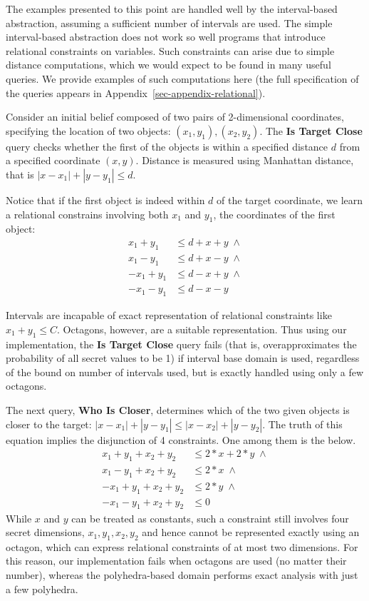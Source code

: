 The examples presented to this point are handled well by the
interval-based abstraction, assuming a sufficient number of intervals
are used.  The simple interval-based abstraction does not work so well
programs that introduce relational constraints on variables.  Such
constraints can arise due to simple distance 
computations, which we would expect to be found in many useful
queries. We provide examples of such computations here (the full
specification of the queries appears in
Appendix~\ref{sec-appendix-relational}). 

Consider an initial belief composed of two pairs of 2-dimensional
coordinates, specifying the location of two objects: $ (x_1,y_1),
(x_2,y_2)$. The \textbf{Is Target Close} query checks
whether the first of the objects is within a specified distance $ d $
from a specified coordinate $ (x,y) $. Distance is measured using
Manhattan distance, that is $ | x - x_1 | + | y - y_1 | \leq d $. 

Notice that if the first object is indeed within $ d $ of the target
coordinate, we learn a relational constrains involving both $ x_1 $
and $ y_1 $, the coordinates of the first object:
\begin{align*}
x_1 + y_1 & \leq d + x + y\; \wedge \\
x_1 - y_1 & \leq d + x - y\; \wedge \\
-x_1 + y_1 & \leq d - x + y\; \wedge \\
-x_1 - y_1 & \leq d - x - y
\end{align*}

Intervals are incapable of exact representation of relational
constraints like $ x_1 + y_1 \leq C $. Octagons, however, are a
suitable representation. Thus
using our implementation, the \textbf{Is Target Close}
query fails (that is, overapproximates the probability of all secret
values to be 1) if interval base domain is used, regardless of
the bound on number of intervals used, but is exactly handled using
only a few octagons.

The next query, \textbf{Who Is Closer}, determines which of the two given
objects is closer to the target: $ | x - x_1 | + | y - y_1 | \leq | x
- x_2 | + | y - y_2 | $. The truth of this equation implies the
disjunction of 4 constraints. One among them is the below.
\begin{align*}
x_1 + y_1 + x_2 + y_2 & \leq 2*x + 2*y\; \wedge \\
x_1 - y_1 + x_2 + y_2 & \leq 2*x\; \wedge \\
-x_1 + y_1 + x_2 + y_2 & \leq 2*y\; \wedge \\
-x_1 - y_1 + x_2 + y_2 & \leq 0
\end{align*}
While $ x $ and $ y $ can be treated as constants, such a constraint
still involves four secret dimensions, $ x_1, y_1, x_2, y_2 $ and
hence cannot be represented exactly using an octagon, which can express
relational constraints of at most two dimensions. For this reason,
our implementation fails when octagons are used (no matter their
number), whereas the polyhedra-based domain performs exact analysis 
with just a few polyhedra.


